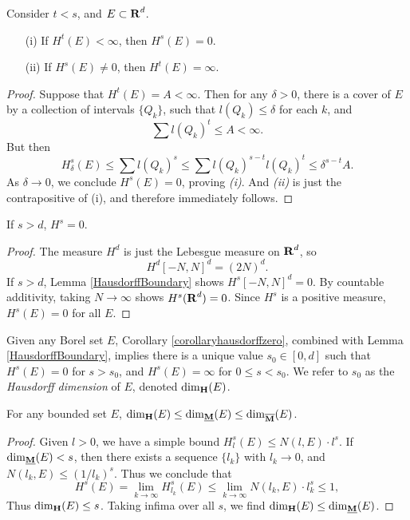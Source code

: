 \begin{lemma} \label{HausdorffBoundary}
	Consider $t < s$, and $E \subset \operatorname{\mathbf{R}}^d$.
	\begin{enumerate}
		\item[(i)] If $H^t(E) < \infty$, then $H^s(E) = 0$.
		\item[(ii)] If $H^s(E) \neq 0$, then $H^t(E) = \infty$.
	\end{enumerate}
\end{lemma}
\begin{proof}
	Suppose that $H^t(E) = A < \infty$. Then for any $\delta > 0$, there is a cover of $E$ by a collection of intervals $\{ Q_k \}$, such that $l(Q_k) \leq \delta$ for each $k$, and
	\[ \sum l(Q_k)^t \leq A < \infty. \]
	But then
	\[ H^s_\delta(E) \leq \sum l(Q_k)^s \leq \sum l(Q_k)^{s-t} l(Q_k)^t \leq \delta^{s-t} A. \]
	As $\delta \to 0$, we conclude $H^s(E) = 0$, proving \emph{(i)}. And \emph{(ii)} is just the contrapositive of (i), and therefore immediately follows.
\end{proof}

\begin{corollary} \label{corollaryhausdorffzero}
	If $s > d$, $H^s = 0$.
\end{corollary}
\begin{proof}
	The measure $H^d$ is just the Lebesgue measure on $\operatorname{\mathbf{R}}^d$, so
	\[ H^d[-N,N]^d = (2N)^d. \]
	If $s > d$, Lemma \ref{HausdorffBoundary} shows $H^s[-N,N]^d = 0$. By countable additivity, taking $N \to \infty$ shows $H^s(\operatorname{\mathbf{R}}^d) = 0$. Since $H^s$ is a positive measure, $H^s(E) = 0$ for all $E$.
\end{proof}

Given any Borel set $E$, Corollary \ref{corollaryhausdorffzero}, combined with Lemma \ref{HausdorffBoundary}, implies there is a unique value $s_0 \in [0,d]$ such that $H^s(E) = 0$ for $s > s_0$, and $H^s(E) = \infty$ for $0 \leq s < s_0$. We refer to $s_0$ as the \emph{Hausdorff dimension} of $E$, denoted $\operatorname{\dim_{\mathbf{H}}}(E)$.

\begin{theorem}
	For any bounded set $E$, $\operatorname{\dim_{\mathbf{H}}}(E) \leq \operatorname{\dim_{\underline{\mathbf{M}}}}(E) \leq \operatorname{\dim_{\overline{\mathbf{M}}}}(E)$.
\end{theorem}
\begin{proof}
	Given $l > 0$, we have a simple bound $H^s_l(E) \leq N(l,E) \cdot l^s$. If $\operatorname{\dim_{\underline{\mathbf{M}}}}(E) < s$, then there exists a sequence $\{ l_k \}$ with $l_k \to 0$, and $N(l_k,E) \leq (1/l_k)^s$. Thus we conclude that
	\[ H^s(E) = \lim_{k \to \infty} H^s_{l_k}(E) \leq \lim_{k \to \infty} N(l_k,E) \cdot l_k^s \leq 1, \]
	Thus $\operatorname{\dim_{\mathbf{H}}}(E) \leq s$. Taking infima over all $s$, we find $\operatorname{\dim_{\mathbf{H}}}(E) \leq \operatorname{\dim_{\underline{\mathbf{M}}}}(E)$.
\end{proof}


